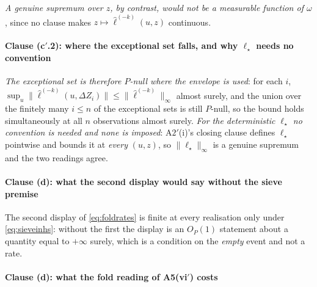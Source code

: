 \emph{A genuine supremum over $z$, by contrast, would not be a measurable function of $\omega$}, since no
clause makes $z\mapsto\hat\ell^{(-k)}(u,z)$ continuous.

\paragraph{Clause \textup{(c$'$.2)}: where the exceptional set falls, and why $\ell_\star$ needs no convention}

\emph{The exceptional set is therefore $P$-null where the envelope is used}:
for each $i$, $\sup_u\|\hat\ell^{(-k)}(u,\Delta Z_i)\|\le\|\hat\ell^{(-k)}\|_\infty$ almost surely, and
the union over the finitely many $i\le n$ of the exceptional sets is still $P$-null, so the bound holds
simultaneously at all $n$ observations almost surely. \emph{For the deterministic $\ell_\star$ no
convention is needed and none is imposed}: A$2'$(i)'s closing clause defines $\ell_\star$ pointwise and
 bounds it at \emph{every} $(u,z)$, so $\|\ell_\star\|_\infty$ is a genuine supremum and
the two readings agree.

\paragraph{Clause \textup{(d)}: what the second display would say without the sieve premise}

The second display of \eqref{eq:foldrates} is finite at every realisation only under
\eqref{eq:sieveinhs}: without the first the display is an $O_P(1)$ statement about a quantity equal to
$+\infty$ surely, which is a condition on the \emph{empty} event and not a rate.

\paragraph{Clause \textup{(d)}: what the fold reading of A5(vi$'$) costs}

